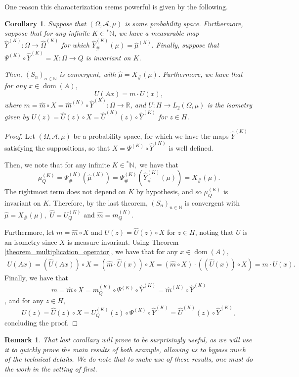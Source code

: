 \documentclass[10pt,a4paper]{amsart}
\newtheorem{cor}[thm]{Corollary}
\newtheorem{remark}[thm]{Remark}
\def \Dom{\operatorname{dom}}
\def \HOM{\hat{\Omega}}
\def \HMU{\hat{\mu}}
\def \HU{\hat{U}}
\def \Hm{\hat{m}}
\begin{document}
One reason this characterization seems powerful is given by the following.
\begin{cor}\label{corollary_nonstandard_invariance}
	Suppose that $(\Omega, \mathcal{A}, \mu)$ is some probability space. Furthermore, suppose that for any infinite $K\in{}^*\mathbb{N}$, we have a measurable map $\hat{Y}^{(K)}:\Omega\rightarrow\HOM^{(K)}$ for which $\hat{Y}^{(K)}_{\#}(\mu)=\HMU^{(K)}.$ Finally, suppose that $\Psi^{(K)}\circ \hat{Y}^{(K)}=X:\Omega\rightarrow Q$ is invariant on $K$. 
	
	Then, $(S_n)_{n\in\mathbb{N}}$ is convergent, with $\HMU=X_{\#}(\mu)$. Furthermore, we have that for any $x\in\Dom(A),$  $$U(Ax)=m\cdot U(x),$$ where $m=\Hm\circ X=\Hm^{(K)}\circ \hat{Y}^{(K)}: \Omega\rightarrow\mathbb{R}$, and $U: H\rightarrow L_2(\Omega,\mu)$ is the isometry given by $U(z)=\HU(z)\circ X=\HU^{(K)}(z)\circ \hat{Y}^{(K)}$ for $z\in H$. %
\end{cor}
\begin{proof}
	Let $(\Omega,\mathcal{A},\mu)$ be a probability space, for which we have the maps $\hat{Y}^{(K)}$ satisfying the suppositions, so that $X=\Psi^{(K)}\circ \hat{Y}^{(K)}$ is well defined.
	
	Then, we note that for any infinite $K\in{}^*\mathbb{N},$ we have that $$\mu_Q^{(K)}=\Psi^{(K)}_{\#}(\HMU^{(K)})=\Psi^{(K)}_{\#}(\hat{Y}^{(K)}_{\#}(\mu))=X_{\#}(\mu).$$ The rightmost term does not depend on $K$ by hypothesis, and so $\mu_Q^{(K)}$ is invariant on $K$. Therefore, by the last theorem, $(S_n)_{n\in\mathbb{N}}$ is convergent with $\HMU=X_{\#}(\mu),$ $\HU=U_Q^{(K)}$ and $\Hm=m_Q^{(K)}.$
	
	Furthermore, let $m=\Hm\circ X$ and $U(z)=\HU(z)\circ X$  for $z\in H$, noting that $U$ is an isometry since $X$ is measure-invariant. Using Theorem \ref{theorem_multiplication_operator}, we have that for any $x\in\Dom(A),$
	\begin{align*}
		U(Ax)=(\HU(Ax))\circ X=(\Hm\cdot \HU(x))\circ X=(\Hm\circ X)\cdot ((\HU(x))\circ X)=m\cdot U(x).
	\end{align*} 
	Finally, we have that $$m=\Hm\circ X=m_Q^{(K)}\circ \Psi^{(K)}\circ \hat{Y}^{(K)}=\Hm^{(K)}\circ\hat{Y}^{(K)}$$, and for any $z\in H$, $$U(z)=\HU(z)\circ X=U_Q^{(K)}(z)\circ\Psi^{(K)}\circ \hat{Y}^{(K)}=\HU^{(K)}(z)\circ \hat{Y}^{(K)},$$ concluding the proof.
\end{proof}
\begin{remark}
	That last corollary will prove to be surprisingly useful, as we will use it to quickly prove the main results of both example, allowing us to bypass much of the technical details. We do note that to make use of these results, one must do the work in the setting of \cite{nonez2024spectralequivalencesnonstandardsamplings} first.
\end{remark}
\end{document}
